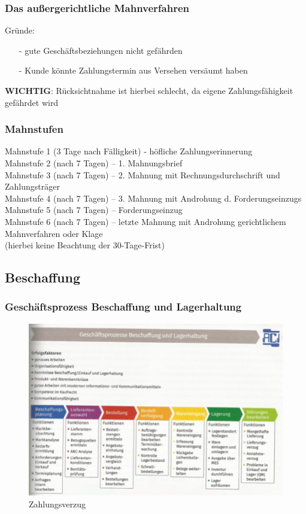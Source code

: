 \documentclass[10pt]{article}
\begin{document}
\subsubsection {Das außergerichtliche Mahnverfahren}
Gründe:
\begin{itemize}
\item[-] gute Geschäftsbeziehungen nicht gefährden
\item[-] Kunde könnte Zahlungstermin aus Versehen versäumt haben
\end{itemize}
\textbf {WICHTIG}: Rücksichtnahme ist hierbei schlecht, da eigene Zahlungsfähigkeit gefährdet wird

\subsubsection{Mahnstufen} 
Mahnstufe 1 (3 Tage nach Fälligkeit) - höfliche Zahlungserinnerung\\
Mahnstufe 2 (nach 7 Tagen) – 1. Mahnungsbrief\\
Mahnstufe 3 (nach 7 Tagen) – 2. Mahnung mit Rechnungsdurchschrift und Zahlungsträger\\
Mahnstufe 4 (nach 7 Tagen) – 3. Mahnung mit Androhung d. Forderungseinzugs\\
Mahnstufe 5 (nach 7 Tagen) – Forderungseinzug\\
Mahnstufe 6 (nach 7 Tagen) – letzte Mahnung mit Androhung gerichtlichem\\
Mahnverfahren oder Klage\\
(hierbei keine Beachtung der 30-Tage-Frist)\\\textbf{}

\subsection{Beschaffung}
\subsubsection {Geschäftsprozess Beschaffung und Lagerhaltung}
\begin{figure}[H]
\begin{center}
  \includegraphics[width=12cm]{Beschaffung.png}
  \end{center}
  \caption{Zahlungsverzug}
\end{figure}
\end{document}
